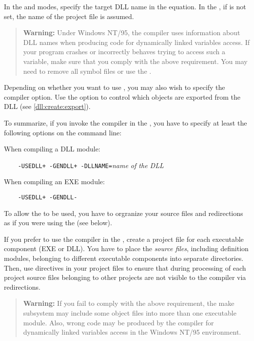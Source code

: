 In the  and
 modes, specify the target DLL name in the
 equation.
In the , if 
is not set, the name of the project file is assumed.

\begin{quote}{\footnotesize
    {\bf Warning:} Under Windows NT/95, the compiler uses information
    about DLL names when producing code for dynamically linked variables
    access. If your program crashes or incorrectly behaves trying to access
    such a variable, make sure that you comply with the above requirement.
    You may need to remove all symbol files or use the
    .
    } %
\end{quote}

Depending on whether you want to use ,
you may also wish to specify the  compiler option.
Use the  option to control which objects are exported from
the DLL (see \ref{dll:create:export}).

To summarize, if you invoke the compiler in the ,
you have to specify at least the following options on the command line:

When compiling a DLL module:

\verb'    -USEDLL+ -GENDLL+ -DLLNAME='{\it name of the DLL}

When compiling an EXE module:

\verb'    -USEDLL+ -GENDLL-'

To allow the  to be used, you have to
orgranize your source files and redirections as if you were using the
 (see below).

If you prefer to use the compiler in the ,
create a project file for each executable component (EXE or DLL).
You have to place the {\em source files}, including \mt{}
definition modules, belonging to different executable components
into separate directories. Then, use  directives
in your project files to ensure that during processing of
each project source files belonging to other projects are not
visible to the compiler via redirections.

\begin{quote}{\footnotesize
    {\bf Warning:} If you fail to comply with the above requirement,
    the make subsystem may include some object files into more than one
    executable module. Also, wrong code may be produced by the compiler
    for dynamically linked variables access in the Windows NT/95 environment.
    } %
\end{quote}

